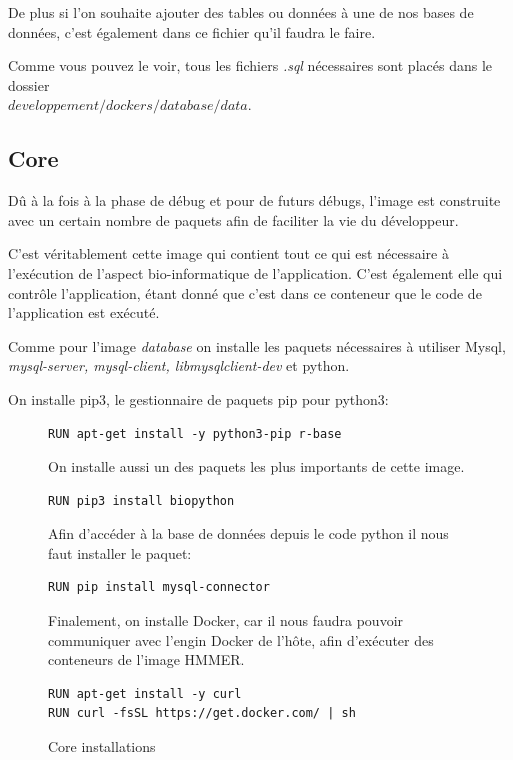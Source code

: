 De plus si l'on souhaite ajouter des tables ou données à une de nos bases de données, c'est également dans ce fichier qu'il faudra le faire.

Comme vous pouvez le voir, tous les fichiers \emph{.sql} nécessaires sont placés dans le dossier \\ \emph{$developpement/dockers/database/data$}.


\subsection{Core}
Dû à la fois à la phase de débug et pour de futurs débugs, l'image est construite avec un certain nombre de paquets afin de faciliter la vie du développeur.

C'est véritablement cette image qui contient tout ce qui est nécessaire à l'exécution de l'aspect bio-informatique de l'application. C'est également elle qui contrôle l'application, étant donné que c’est dans ce conteneur que le code de l'application est exécuté.

Comme pour l'image \emph{database} on installe les paquets nécessaires à utiliser Mysql, \emph{mysql-server, mysql-client, libmysqlclient-dev} et python.

On installe pip3, le gestionnaire de paquets pip pour python3:

\begin{figure}[H] 
\centering 
\begin{lstlisting}[frame=single]
RUN apt-get install -y python3-pip r-base
\end{lstlisting}

On installe aussi un des paquets les plus importants de cette image.

\begin{lstlisting}[frame=single]
RUN pip3 install biopython
\end{lstlisting}

Afin d'accéder à la base de données depuis le code python il nous faut installer le paquet:

\begin{lstlisting}[frame=single]
RUN pip install mysql-connector
\end{lstlisting}

Finalement, on installe Docker, car il nous faudra pouvoir communiquer avec l'engin Docker de l'hôte, afin d'exécuter des conteneurs de l'image HMMER.

\begin{lstlisting}[frame=single]
RUN apt-get install -y curl
RUN curl -fsSL https://get.docker.com/ | sh
\end{lstlisting}
\caption[Core installations]{Core installations}
\label{fig:coreInstall} 
\end{figure}

